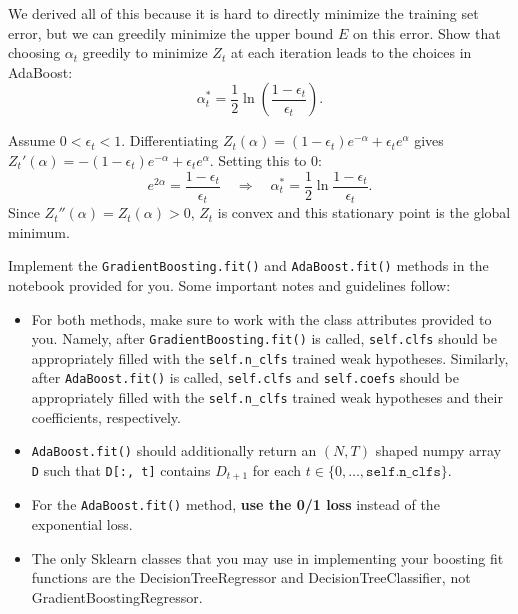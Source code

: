 \documentclass{article}
\begin{document}
\problem[2]
We derived all of this because it is hard to directly minimize the training set error, but we can greedily minimize the upper bound $E$ on this error. Show that choosing $\alpha_t$
greedily to minimize $Z_t$ at each iteration leads to the choices in
AdaBoost:
$$\alpha_{t}^* = \frac{1}{2} \ln \left(\frac{1 - \epsilon_t}{\epsilon_t} \right).$$

\begin{solution}
\upshape
Assume $0<\epsilon_t<1$. Differentiating $Z_t(\alpha)=(1-\epsilon_t)e^{-\alpha}+\epsilon_te^{\alpha}$ gives $Z_t'(\alpha)=-(1-\epsilon_t)e^{-\alpha}+\epsilon_te^{\alpha}$. Setting this to $0$:
\[
e^{2\alpha}=\frac{1-\epsilon_t}{\epsilon_t}\quad\Longrightarrow\quad \alpha_t^*=\frac12\ln\frac{1-\epsilon_t}{\epsilon_t}.
\]
Since $Z_t''(\alpha)=Z_t(\alpha)>0$, $Z_t$ is convex and this stationary point is the global minimum.
\end{solution}

\begin{problem}[14]
    Implement the \texttt{GradientBoosting.fit()} and \texttt{AdaBoost.fit()} methods in the notebook provided for you. Some important notes and guidelines follow:
    \begin{itemize}
        \item For both methods, make sure to work with the class attributes provided to you. Namely, after \texttt{GradientBoosting.fit()} is called, \texttt{self.clfs} should be appropriately filled with the \texttt{self.n_clfs} trained weak hypotheses. Similarly, after \texttt{AdaBoost.fit()} is called, \texttt{self.clfs} and \texttt{self.coefs} should be appropriately filled with the \texttt{self.n_clfs} trained weak hypotheses and their coefficients, respectively.
        \item \texttt{AdaBoost.fit()} should additionally return an $(N, T)$ shaped numpy array \texttt{D} such that \texttt{D[:, t]} contains $D_{t+1}$ for each $t \in \{0, \ldots, \texttt{self.n_clfs}\}$.
        \item For the \texttt{AdaBoost.fit()} method, \textbf{use the 0/1 loss} instead of the exponential loss.
	\item The only Sklearn classes that you may use in implementing your boosting fit functions are the DecisionTreeRegressor and DecisionTreeClassifier, not GradientBoostingRegressor.
    \end{itemize}
\end{problem}
\end{document}
